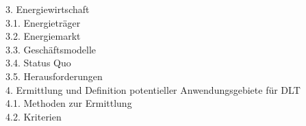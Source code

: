 \begin{small}
	3. Energiewirtschaft\\
	\noindent\hspace*{10mm}%
	3.1. Energieträger\\
	\noindent\hspace*{10mm}%
	3.2. Energiemarkt\\
	\noindent\hspace*{10mm}%
	3.3. Geschäftsmodelle\\
	\noindent\hspace*{10mm}%
	3.4. Status Quo\\
	\noindent\hspace*{10mm}%
	3.5. Herausforderungen\\
	4. Ermittlung und Definition potentieller Anwendungsgebiete für DLT\\
	\noindent\hspace*{10mm}%
	4.1. Methoden zur Ermittlung\\
	\noindent\hspace*{10mm}%
	4.2. Kriterien\\

\end{small}

